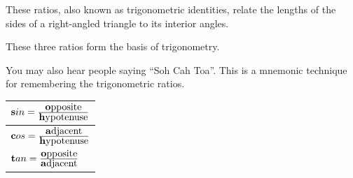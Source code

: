These ratios, also known as trigonometric identities, relate the lengths of the sides of a right-angled triangle to its interior angles.\par 

These three ratios form the basis of trigonometry. \par

You may also hear people saying ``Soh Cah Toa''. This is a mnemonic technique for remembering the trigonometric ratios.\par 

\begin{table}[H]
\begin{center}
\label{m39408*id79953}
\noindent

\begin{tabular}{|l|}\hline

$\mathbf{s}in=\frac{\mbox{\textbf{o}pposite}}{\mbox{\textbf{h}ypotenuse}} $

\\  \hline

$\mathbf{c}os=\frac{\mbox{\textbf{a}djacent}}{\mbox{\textbf{h}ypotenuse}} $

\\ \hline

$\mathbf{t}an=\frac{\mbox{\textbf{o}pposite}}{\mbox{\textbf{a}djacent}} $

\\   \hline
\end{tabular}
\end{center}
\end{table}
\par


